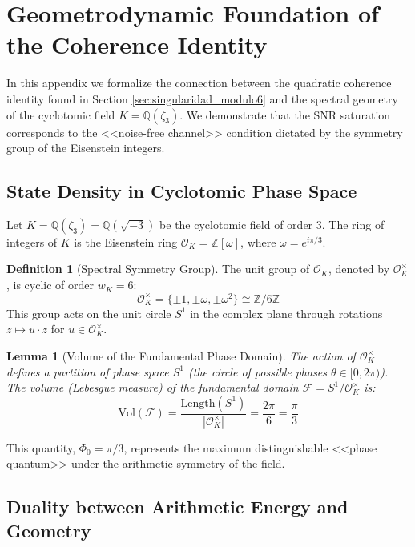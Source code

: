\documentclass[12pt, a4paper]{article}
\theoremstyle{plain}
\newtheorem{lema}[teorema]{Lemma}
\theoremstyle{definition}
\newtheorem{definicion}[teorema]{Definition}
\theoremstyle{remark}
\begin{document}
\section{Geometrodynamic Foundation of the Coherence Identity}
\label{ap:geometrodinamica}

In this appendix we formalize the connection between the quadratic coherence identity found in Section \ref{sec:singularidad_modulo6} and the spectral geometry of the cyclotomic field $K = \mathbb{Q}(\zeta_3)$. We demonstrate that the SNR saturation corresponds to the <<noise-free channel>> condition dictated by the symmetry group of the Eisenstein integers.

\subsection{State Density in Cyclotomic Phase Space}

Let $K = \mathbb{Q}(\zeta_3) = \mathbb{Q}(\sqrt{-3})$ be the cyclotomic field of order 3. The ring of integers of $K$ is the Eisenstein ring $\mathcal{O}_K = \mathbb{Z}[\omega]$, where $\omega = e^{i\pi/3}$.

\begin{definicion}[Spectral Symmetry Group]
The unit group of $\mathcal{O}_K$, denoted by $\mathcal{O}_K^\times$, is cyclic of order $w_K = 6$:
\[
\mathcal{O}_K^\times = \{ \pm 1, \pm \omega, \pm \omega^2 \} \cong \mathbb{Z}/6\mathbb{Z}
\]
This group acts on the unit circle $S^1$ in the complex plane through rotations $z \mapsto u \cdot z$ for $u \in \mathcal{O}_K^\times$.
\end{definicion}

\begin{lema}[Volume of the Fundamental Phase Domain]
The action of $\mathcal{O}_K^\times$ defines a partition of phase space $S^1$ (the circle of possible phases $\theta \in [0, 2\pi)$). The volume (Lebesgue measure) of the fundamental domain $\mathcal{F} = S^1 / \mathcal{O}_K^\times$ is:
\[
\text{Vol}(\mathcal{F}) = \frac{\text{Length}(S^1)}{|\mathcal{O}_K^\times|} = \frac{2\pi}{6} = \frac{\pi}{3}
\]
\end{lema}

This quantity, $\Phi_0 = \pi/3$, represents the maximum distinguishable <<phase quantum>> under the arithmetic symmetry of the field.

\subsection{Duality between Arithmetic Energy and Geometry}
\end{document}
